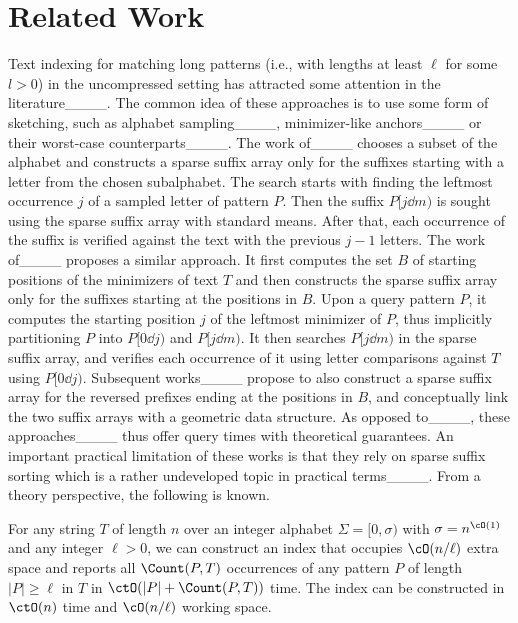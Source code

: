 \section{Related Work}
\label{sec:related}

Text indexing for matching long patterns (i.e., with lengths at least $\ell$ for some $l > 0$) in the uncompressed setting
has attracted some attention in the literature____. The common idea of these approaches is to use some form of sketching, such as alphabet sampling____, minimizer-like anchors____ or their worst-case counterparts____. The work of____ chooses a subset of the alphabet and constructs a sparse suffix array only for the suffixes starting with a letter from the chosen 
subalphabet. The search starts with finding the leftmost occurrence $j$ of a sampled letter of 
pattern $P$. Then the suffix $P[j\dd m)$ is sought
using the sparse suffix array with standard means. After that, each occurrence of
the suffix is verified against the text with the previous $j - 1$ letters.
The work of____ proposes a similar approach. It first computes the set $B$ of starting positions of the minimizers of text $T$
and then constructs the sparse suffix array only for the suffixes starting at the positions in $B$.
Upon a query pattern $P$, it computes the starting position $j$ of the leftmost minimizer of $P$,
thus implicitly partitioning $P$ into $P[0\dd j)$ and $P[j\dd m)$. It then searches
$P[j\dd m)$ in the sparse suffix array, and verifies each occurrence of it using letter comparisons
against $T$ using $P[0\dd j)$. Subsequent works____ propose to also construct a sparse suffix array for the reversed prefixes
ending at the positions in $B$, and conceptually link the two suffix arrays with a geometric data structure.
As opposed to____, these approaches____ thus offer query times with theoretical guarantees. An important practical limitation of these works is that they rely on sparse suffix sorting which is a rather undeveloped topic in practical terms____.
From a theory perspective, the following is known.


\begin{theorem}[____]\label{the:worst-case}
For any string $T$ of length $n$ over an integer alphabet $\Sigma=[0,\sigma)$ with $\sigma=n^{\cO(1)}$ and any integer $\ell>0$, we can construct an index that occupies $\cO(n/\ell)$ extra space and reports all $\Count(P,T)$ occurrences of any pattern $P$ of length $|P|\geq \ell$ in $T$ in $\ctO(|P|+\Count(P,T))$ time. The index can be constructed in $\ctO(n)$ time and $\cO(n/\ell)$ working space.
\end{theorem}

